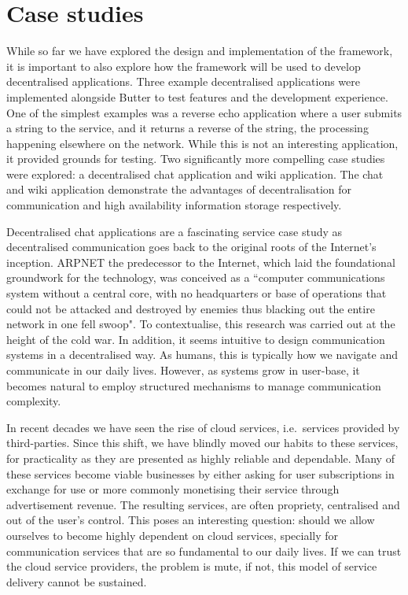 \chapter{Case studies}
\label{sec:caseStudies}


While so far we have explored the design and implementation of the framework, it is important to also explore how the framework will be used to develop decentralised applications. Three example decentralised applications were implemented alongside Butter to test features and the development experience. One of the simplest examples was a reverse echo application where a user submits a string to the service, and it returns a reverse of the string, the processing happening elsewhere on the network. While this is not an interesting application, it provided grounds for testing. Two significantly more compelling case studies were explored: a decentralised chat application and wiki application. The chat and wiki application demonstrate the advantages of decentralisation for communication and high availability information storage respectively.

Decentralised chat applications are a fascinating service case study as decentralised communication goes back to the original roots of the Internet's inception. ARPNET the predecessor to the Internet, which laid the foundational groundwork for the technology, was conceived as a ``computer communications system without a central core, with no headquarters or base of operations that could not be attacked and destroyed by enemies thus blacking out the entire network in one fell swoop"\cite{featherly2022arpnet}. To contextualise, this research was carried out at the height of the cold war. In addition, it seems intuitive to design communication systems in a decentralised way. As humans, this is typically how we navigate and communicate in our daily lives. However, as systems grow in user-base, it becomes natural to employ structured mechanisms to manage communication complexity.

In recent decades we have seen the rise of cloud services, i.e.\ services provided by third-parties\cite{redhat2022cloud}. Since this shift, we have blindly moved our habits to these services, for practicality as they are presented as highly reliable and dependable. Many of these services become viable businesses by either asking for user subscriptions in exchange for use or more commonly monetising their service through advertisement revenue. The resulting services, are often propriety, centralised and out of the user's control. This poses an interesting question: should we allow ourselves to become highly dependent on cloud services, specially for communication services that are so fundamental to our daily lives. If we can trust the cloud service providers, the problem is mute, if not, this model of service delivery cannot be sustained\cite{benkler2016degrees}.

